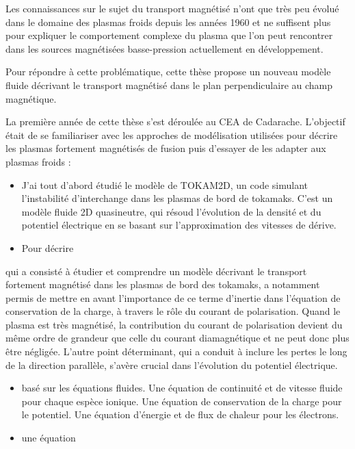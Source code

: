 Les connaissances sur le sujet du transport magnétisé n'ont que très peu évolué
dans le domaine des plasmas froids depuis les années 1960 et ne suffisent plus
pour expliquer le comportement complexe du plasma que l'on peut
rencontrer dans les sources magnétisées basse-pression actuellement en développement.

Pour répondre à cette problématique, cette thèse propose un nouveau
modèle fluide décrivant le transport magnétisé dans le plan perpendiculaire au
champ magnétique.

La première année de cette thèse s'est déroulée au CEA de Cadarache.
L'objectif était de se familiariser avec les approches de modélisation
utilisées pour décrire les plasmas fortement magnétisés de fusion puis d'essayer
de les adapter aux plasmas froids :

\begin{itemize}
  \item J'ai tout d'abord étudié le modèle de TOKAM2D, un code simulant
  l'instabilité d'interchange dans les plasmas de bord de tokamaks. C'est un
  modèle fluide 2D quasineutre, qui résoud l'évolution de la densité et du
  potentiel électrique en se basant sur l'approximation des vitesses de dérive.
  \item Pour décrire 
\end{itemize} 
  qui a consisté à étudier et comprendre un
modèle décrivant le transport fortement magnétisé dans les plasmas de bord des tokamaks, a notamment permis de mettre en avant l'importance de ce terme d'inertie dans l'équation de conservation de la charge, à travers le rôle
du courant de polarisation.
Quand le plasma est très magnétisé, la contribution du courant de polarisation
devient du même ordre de grandeur que celle du courant diamagnétique et ne
peut donc plus être négligée. L'autre point déterminant, qui a conduit à
inclure les pertes le long de la direction parallèle, s'avère crucial dans
l'évolution du potentiel électrique.

\begin{itemize}
  \item basé sur les équations fluides. Une équation de continuité et de vitesse
  fluide pour chaque espèce ionique. Une équation de conservation de la charge
  pour le potentiel. Une équation d'énergie et de flux de chaleur pour les
  électrons.
  \item une équation 
\end{itemize} 

